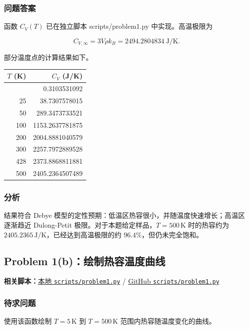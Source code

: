 \documentclass[12pt,a4paper,fontset=none]{ctexart}
\renewcommand{\texttt}[1]{{\ttfamily\footnotesize #1}}
\newcounter{none}
\renewcommand{\texttt}[1]{{\ttfamily #1}}%
\newcommand{\fileinline}[1]{{\urlstyle{same}\nolinkurl{#1}}}
\newcommand{\metadataline}[1]{#1}
\newcommand{\scriptpath}[1]{\fileinline{#1}}
\newcommand{\githubscriptsbase}{https://github.com/Void0312Aurora/computational-physics-homework-2026/blob/main/07/scripts}
\newcommand{\scriptlink}[1]{\noindent\metadataline{\textbf{相关脚本：}\href{../../../scripts/#1}{本地 \scriptpath{scripts/#1}} / \href{\githubscriptsbase/#1}{GitHub \scriptpath{scripts/#1}}}\par\medskip}
\begin{document}
\subsubsection{问题答案}\label{ux95eeux9898ux7b54ux6848}

函数 \(C_V(T)\) 已在独立脚本 \texttt{scripts/problem1.py} 中实现。高温极限为

\[
C_{V,\infty}=3V\rho k_B=2494.2804834\ \mathrm{J/K}.
\]

部分温度点的计算结果如下。

{\def\LTcaptype{none} %
\begin{longtable}[]{@{}rr@{}}
\toprule\noalign{}
\(T\) (K) & \(C_V\) (J/K) \\
\midrule\noalign{}
\endhead
\bottomrule\noalign{}
\endlastfoot
5 & 0.3103531092 \\
25 & 38.7307578015 \\
50 & 289.3473733521 \\
100 & 1153.2637781875 \\
200 & 2004.8881040579 \\
300 & 2257.7972889528 \\
428 & 2373.8868811881 \\
500 & 2405.2364507489 \\
\end{longtable}
}

\subsubsection{分析}\label{ux5206ux6790}

结果符合 Debye 模型的定性预期：低温区热容很小，并随温度快速增长；高温区逐渐趋近 Dulong-Petit 极限。对于本题给定样品，\(T=500\,\mathrm{K}\) 时的热容约为 \(2405.2365\,\mathrm{J/K}\)，已经达到高温极限的约 \(96.4\%\)，但仍未完全饱和。

\subsection{Problem 1(b)：绘制热容温度曲线}\label{problem-1b}

\scriptlink{problem1.py}

\subsubsection{待求问题}\label{ux5f85ux6c42ux95eeux9898-1}

使用该函数绘制 \(T=5\,\mathrm{K}\) 到 \(T=500\,\mathrm{K}\) 范围内热容随温度变化的曲线。
\end{document}
